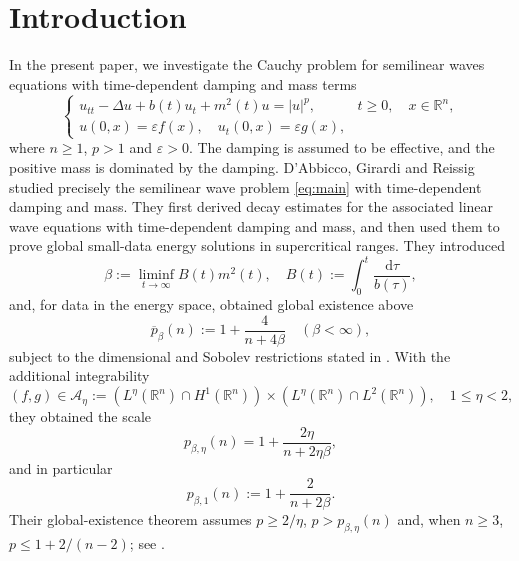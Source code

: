 \documentclass[11pt,reqno]{amsart}
\theoremstyle{definition}
\theoremstyle{remark}
\begin{document}
	\tableofcontents
	
	\section{Introduction}
	
	In the present paper, we investigate the Cauchy problem for semilinear waves equations with time-dependent damping and mass terms
	\begin{equation}
		\label{eq:main}
		\begin{cases}
			u_{tt}-\Delta u+b(t)u_t+m^2(t)u=|u|^p,
			&t \geq 0, \quad x\in\mathbb{R}^n,\\
			u(0,x)=\varepsilon f(x), \quad u_t(0,x)=\varepsilon g(x),
		\end{cases}
	\end{equation}
	where $n\geq1$, $p>1$ and $\varepsilon>0$. The damping is assumed to be effective, and the positive mass is dominated by the damping. D'Abbicco, Girardi and Reissig studied precisely the semilinear wave problem \eqref{eq:main} with time-dependent damping and mass. They first derived decay estimates for the associated linear wave equations with time-dependent damping and mass, and then used them to prove global small-data energy solutions in supercritical ranges. They introduced
	\begin{equation}
		\label{eq:beta}
		\beta:=\liminf_{t\to\infty}B(t)m^2(t),
		\quad
		B(t):=\int_0^t\frac{\mathrm{d}\tau}{b(\tau)},
	\end{equation}
	and, for data in the energy space, obtained global existence above
	$$
	\overline p_{\beta}(n):=1+\frac{4}{n+4\beta}
	\quad(\beta<\infty),
	$$
	subject to the dimensional and Sobolev restrictions stated in \cite[Theorem 2]{DGR2019}. With the additional integrability
	$$
	(f,g)\in\mathcal A_\eta
	:=(L^\eta(\mathbb R^n)\cap H^1(\mathbb R^n))\times(L^\eta(\mathbb R^n)\cap L^2(\mathbb R^n)),
	\quad 1\leq\eta<2,
	$$
	they obtained the scale
	$$
	p_{\beta,\eta}(n)=1+\frac{2\eta}{n+2\eta\beta},
	$$
	and in particular
	\begin{equation}
		\label{eq:pc}
		p_{\beta,1}(n):=1+\frac{2}{n+2\beta}.
	\end{equation}
	Their global-existence theorem assumes $p\geq2/\eta$, $p>p_{\beta,\eta}(n)$ and, when $n\geq3$, $p\leq1+2/(n-2)$; see \cite[Theorem 3 and Remark 2.7]{DGR2019}.
	
\end{document}
